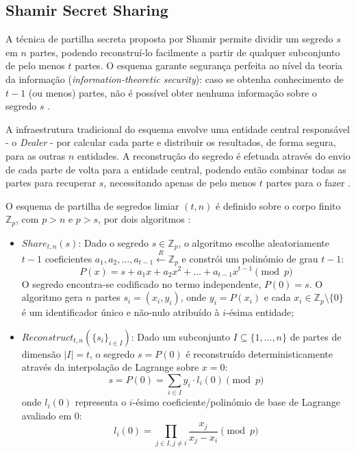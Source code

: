 \subsection{Shamir Secret Sharing}

A técnica de partilha secreta proposta por Shamir permite dividir um segredo $s$ em $n$ partes, podendo reconstruí-lo facilmente a partir de qualquer subconjunto de pelo menos $t$ partes. O esquema garante segurança perfeita ao nível da teoria da informação (\textit{information-theoretic security}): caso se obtenha conhecimento de $t-1$ (ou menos) partes, não é possível obter nenhuma informação sobre o segredo $s$ \cite{shamir1979how}.

A infraestrutura tradicional do esquema envolve uma entidade central responsável - o \textit{Dealer} - por calcular cada parte e distribuir os resultados, de forma segura, para as outras $n$ entidades. A reconstrução do segredo é efetuada através do envio de cada parte de volta para a entidade central, podendo então combinar todas as partes para recuperar $s$, necessitando apenas de pelo menos $t$ partes para o fazer \cite{bogdanov_shamir_notes}.

O esquema de partilha de segredos limiar $(t,n)$ é definido sobre o corpo finito $\mathbb{Z}_p$, com $p > n$ e $p > s$, por dois algoritmos \cite{crites2025syra}:

\begin{itemize}
    \item \textbf{$Share_{t,n}(s)$}: Dado o segredo $s \in \mathbb{Z}_p$, o algoritmo escolhe aleatoriamente $t-1$ coeficientes $a_1, a_2, \ldots, a_{t-1} \xleftarrow{R} \mathbb{Z}_p$ e constrói um polinómio de grau $t-1$:
    \begin{equation*}
        P(x) = s + a_1x + a_2x^2 + \ldots + a_{t-1}x^{t-1} \pmod{p}
    \end{equation*}
    O segredo encontra-se codificado no termo independente, $P(0) = s$. O algoritmo gera $n$ partes $s_i = (x_i, y_i)$, onde $y_i = P(x_i)$ e cada $x_i \in \mathbb{Z}_p \setminus \{0\}$ é um identificador único e não-nulo atribuído à $i$-ésima entidade;
    \item \textbf{$Reconstruct_{t,n}(\{s_i\}_{i \in I})$}: Dado um subconjunto $I \subseteq \{1, \ldots, n\}$ de partes de dimensão $|I| = t$, o segredo $s = P(0)$ é reconstruído deterministicamente através da interpolação de Lagrange sobre $x = 0$:
    \begin{equation*}
        s = P(0) = \sum_{i \in I} y_i \cdot l_i(0) \pmod{p}
    \end{equation*}
    onde $l_i(0)$ representa o $i$-ésimo coeficiente/polinómio de base de Lagrange avaliado em 0:
    \begin{equation*}
        l_i(0) = \prod_{j \in I, j \neq i} \frac{x_j}{x_j - x_i} \pmod{p}
    \end{equation*}
\end{itemize}

